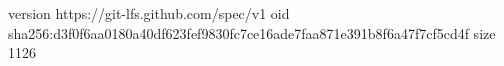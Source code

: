 version https://git-lfs.github.com/spec/v1
oid sha256:d3f0f6aa0180a40df623fef9830fc7ce16ade7faa871e391b8f6a47f7cf5cd4f
size 1126
